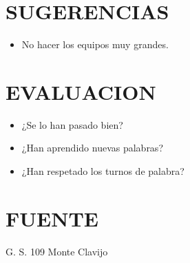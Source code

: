 \documentclass[72pt]{article}
\begin{document}
\section*{SUGERENCIAS} 

\begin{itemize}
    \item No hacer los equipos muy grandes.
\end{itemize}

\section*{EVALUACION} 
\begin{itemize}
    \item ¿Se lo han pasado bien?
    \item ¿Han aprendido nuevas palabras?
    \item ¿Han respetado los turnos de palabra?
\end{itemize}

\section*{FUENTE} 
G. S. 109 Monte Clavijo
\end{document}
